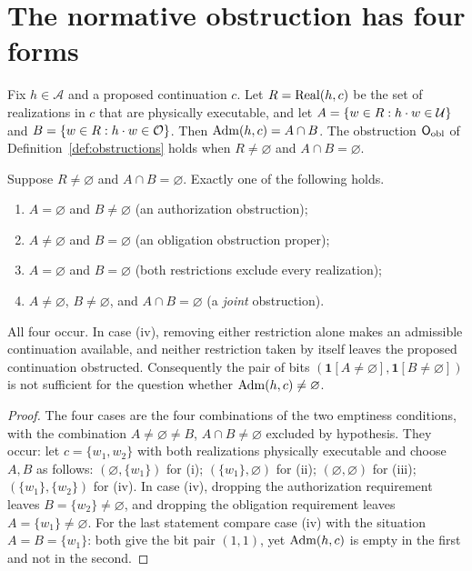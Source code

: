 \section{The normative obstruction has four forms}

Fix $h\in\mathcal A$ and a proposed continuation $c$. Let $R=\operatorname{Real}(h,c)$ be the set of realizations in $c$ that are physically executable, and let $A=\{w\in R: h\cdot w\in\mathcal U\}$ and $B=\{w\in R: h\cdot w\in\mathcal O\}$. Then $\operatorname{Adm}(h,c)=A\cap B$. The obstruction $\mathsf{O}_{\mathrm{obl}}$ of Definition~\ref{def:obstructions} holds when $R\ne\varnothing$ and $A\cap B=\varnothing$.

\begin{newresult}\label{prop:joint-obstruction}
Suppose $R\ne\varnothing$ and $A\cap B=\varnothing$. Exactly one of the following holds.
\begin{enumerate}[nosep,label=(\roman*)]
  \item $A=\varnothing$ and $B\ne\varnothing$ (an authorization obstruction);
  \item $A\ne\varnothing$ and $B=\varnothing$ (an obligation obstruction proper);
  \item $A=\varnothing$ and $B=\varnothing$ (both restrictions exclude every realization);
  \item $A\ne\varnothing$, $B\ne\varnothing$, and $A\cap B=\varnothing$ (a \emph{joint} obstruction).
\end{enumerate}
All four occur. In case (iv), removing either restriction alone makes an admissible continuation available, and neither restriction taken by itself leaves the proposed continuation obstructed. Consequently the pair of bits $(\mathbf 1[A\ne\varnothing],\mathbf 1[B\ne\varnothing])$ is not sufficient for the question whether $\operatorname{Adm}(h,c)\ne\varnothing$.
\end{newresult}
\begin{proof}
The four cases are the four combinations of the two emptiness conditions, with the combination $A\ne\varnothing\ne B$, $A\cap B\ne\varnothing$ excluded by hypothesis. They occur: let $c=\{w_1,w_2\}$ with both realizations physically executable and choose $A,B$ as follows: $(\varnothing,\{w_1\})$ for (i); $(\{w_1\},\varnothing)$ for (ii); $(\varnothing,\varnothing)$ for (iii); $(\{w_1\},\{w_2\})$ for (iv). In case (iv), dropping the authorization requirement leaves $B=\{w_2\}\ne\varnothing$, and dropping the obligation requirement leaves $A=\{w_1\}\ne\varnothing$. For the last statement compare case (iv) with the situation $A=B=\{w_1\}$: both give the bit pair $(1,1)$, yet $\operatorname{Adm}(h,c)$ is empty in the first and not in the second.
\end{proof}

